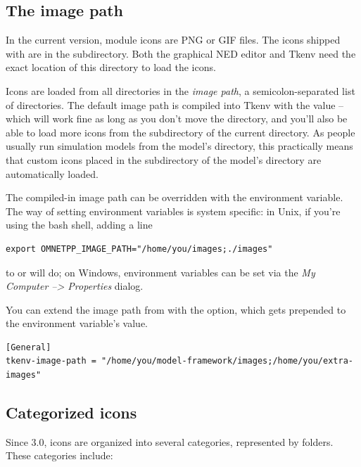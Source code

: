 \subsection{The image path}

In the current {\opp} version, module icons are PNG or GIF files. The icons shipped
with {\opp} are in the  subdirectory. Both the graphical NED editor
and Tkenv need the exact location of this directory to load the icons.

Icons are loaded from all directories in the \textit{image path},
a semicolon-separated list of directories.
The default image path is compiled into Tkenv with the value
 -- which will work fine
as long as you don't move the directory, and you'll also be able to
load more icons from the  subdirectory of the current
directory. As people usually run simulation models from the model's
directory, this practically means that custom icons placed in the
 subdirectory of the model's directory are automatically
loaded.

The compiled-in image path can be overridden with the 
environment variable. The way of setting environment variables is system
specific: in Unix, if you're using the bash shell, adding a line

\begin{verbatim}
export OMNETPP_IMAGE_PATH="/home/you/images;./images"
\end{verbatim}

to  or  will do; on Windows, environment variables
can be set via the \textit{My Computer --> Properties} dialog.

You can extend the image path from  with the
 option, which gets prepended to the environment
variable's value.

\begin{verbatim}
[General]
tkenv-image-path = "/home/you/model-framework/images;/home/you/extra-images"
\end{verbatim}


\subsection{Categorized icons}

Since {\opp} 3.0, icons are organized into several categories, represented
by folders. These categories include:

